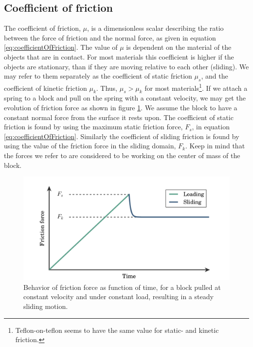 \documentclass[twoside,english]{uiofysmaster}
\begin{document}
\subsection{Coefficient of friction}
The coefficient of friction, $\mu$, is a dimensionless scalar describing the ratio between the force of friction and the normal force, as given in equation \eqref{eq:coefficientOfFriction}.
The value of $\mu$ is dependent on the material of the objects that are in contact. 
For most materials this coefficient is higher if the objects are stationary, than if they are moving relative to each other (sliding).
We may refer to them separately as the coefficient of static friction $\mu_s$, and the coefficient of kinetic friction $\mu_k$.
Thus, $\mu_s>\mu_ k$ for most materials\footnote{Teflon-on-teflon seems to have the same value for static- and kinetic friction.}.
If we attach a spring to a block and pull on the spring with a constant velocity, we may get the evolution of friction force as shown in figure \ref{fig:steadyslide}.
We assume the block to have a constant normal force from the surface it rests upon. 
The coefficient of static friction is found by using the maximum static friction force, $F_s$, in equation \eqref{eq:coefficientOfFriction}. 
Similarly the coefficient of sliding friction is found by using the value of the friction force in the sliding domain, $F_k$.
Keep in mind that the forces we refer to are considered to be working on the center of mass of the block. 
\begin{figure}[H]
	\centering
	\includegraphics[width=0.7\linewidth]{figures/friction/steadySlide}
	\caption{Behavior of friction force as function of time, for a block pulled at constant velocity and under constant load, resulting in a steady sliding motion.}
	\label{fig:steadyslide}
\end{figure}
\end{document}
